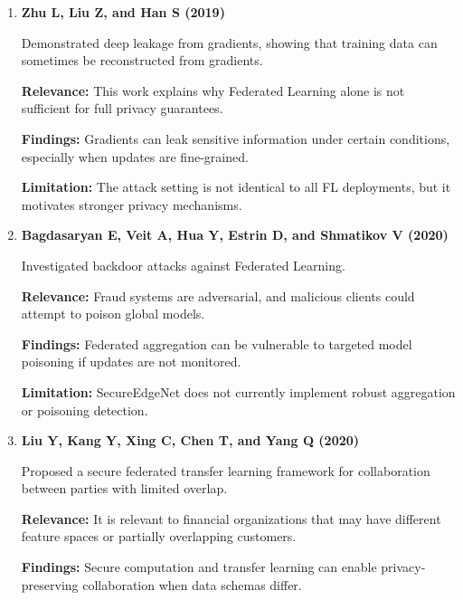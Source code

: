 \begin{enumerate}
    \textbf{Relevance:} Financial institutions may require formal privacy protection beyond raw-data locality.

    \textbf{Findings:} Client-level differential privacy can reduce leakage from model updates, with a tradeoff between privacy and accuracy.

    \textbf{Limitation:} Differential privacy noise is not implemented in the current project.

    \item \textbf{Zhu L, Liu Z, and Han S (2019) \cite{ref20}}

    Demonstrated deep leakage from gradients, showing that training data can sometimes be reconstructed from gradients.

    \textbf{Relevance:} This work explains why Federated Learning alone is not sufficient for full privacy guarantees.

    \textbf{Findings:} Gradients can leak sensitive information under certain conditions, especially when updates are fine-grained.

    \textbf{Limitation:} The attack setting is not identical to all FL deployments, but it motivates stronger privacy mechanisms.

    \item \textbf{Bagdasaryan E, Veit A, Hua Y, Estrin D, and Shmatikov V (2020) \cite{ref21}}

    Investigated backdoor attacks against Federated Learning.

    \textbf{Relevance:} Fraud systems are adversarial, and malicious clients could attempt to poison global models.

    \textbf{Findings:} Federated aggregation can be vulnerable to targeted model poisoning if updates are not monitored.

    \textbf{Limitation:} SecureEdgeNet does not currently implement robust aggregation or poisoning detection.

    \item \textbf{Liu Y, Kang Y, Xing C, Chen T, and Yang Q (2020) \cite{ref22}}

    Proposed a secure federated transfer learning framework for collaboration between parties with limited overlap.

    \textbf{Relevance:} It is relevant to financial organizations that may have different feature spaces or partially overlapping customers.

    \textbf{Findings:} Secure computation and transfer learning can enable privacy-preserving collaboration when data schemas differ.


\end{enumerate}
